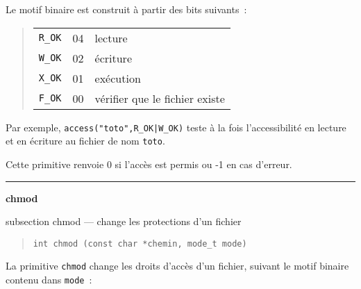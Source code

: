 \documentclass [twoside] {report}
\newcommand {\primitive} [1]
    {
	\phantomsection
	{\large \textbf {#1}}
	\addcontentsline {toc} {subsection} {#1}
    }
\newcommand {\separation}
    {
	\vspace {5mm}
	\nopagebreak
	\hrule
    }
\begin{document}
Le motif binaire est construit à partir des bits
suivants~:
\begin {quote}
    \begin {tabular} {|lll|} \hline
	\verb|R_OK| & 04 & lecture \\
	\verb|W_OK| & 02 & écriture \\
	\verb|X_OK| & 01 & exécution \\
	\verb|F_OK| & 00 & vérifier que le fichier existe \\ \hline
    \end {tabular}
\end {quote}

Par exemple, \verb/access("toto",R_OK|W_OK)/ teste à la fois
l'accessibilité en lecture et en écriture au fichier de nom \texttt {toto}.

Cette primitive renvoie 0 si l'accès est permis
ou -1 en cas d'erreur.




\separation
\primitive {chmod} --- change les protections d'un fichier

\begin {quote}
\begin {verbatim}
int chmod (const char *chemin, mode_t mode)
\end{verbatim}
\end {quote}

La primitive \texttt {chmod} change les droits d'accès
d'un fichier, suivant le motif binaire contenu
dans \texttt {mode}~:
\end{document}
